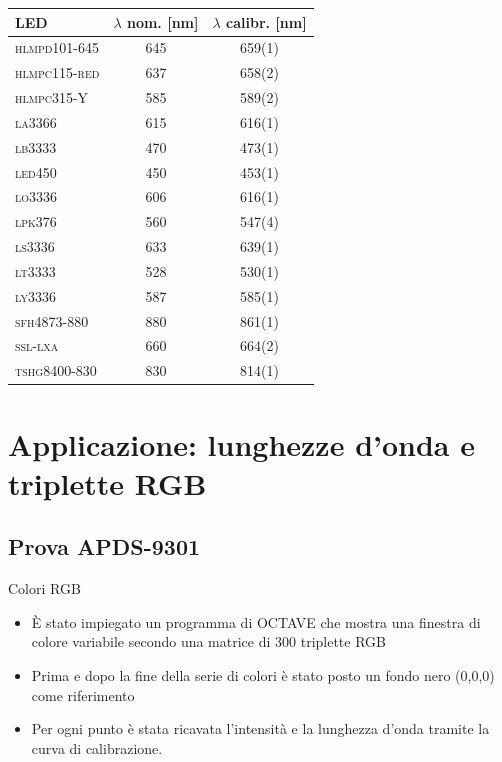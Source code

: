 \documentclass{beamer}
\begin{document}
\begin{frame}
\begin{table}[h]
\centering
\begin{tabular}{l|c|c}
\hline
\textbf{LED} & $\lambda$ nom. [nm] & $\lambda$ calibr. [nm] \\
\hline
\textsc{hlmpd101-645} & 645 & 659(1) \\
\textsc{hlmpc115-red} & 637 & 658(2)  \\
\textsc{hlmpc315-Y} & 585 & 589(2)  \\
\textsc{la3366} & 615 & 616(1) \\
\textsc{lb3333} & 470 & 473(1) \\
\textsc{led450} & 450 & 453(1) \\
\textsc{lo3336} & 606 & 616(1) \\
\textsc{lpk376} & 560 & 547(4) \\
\textsc{ls3336} & 633 & 639(1) \\
\textsc{lt3333} & 528 & 530(1) \\
\textsc{ly3336} & 587 & 585(1) \\
\textsc{sfh4873-880} & 880 & 861(1) \\
\textsc{ssl-lxa} & 660 & 664(2) \\
\textsc{tshg8400-830} & 830 & 814(1) \\
\hline
\end{tabular}
\end{table}
\end{frame}

\section{Applicazione: lunghezze d'onda e triplette RGB}
\subsection{Prova APDS-9301}

\begin{frame}{Colori RGB}
\begin{itemize}
\item È stato impiegato un programma di OCTAVE che mostra una finestra di colore variabile secondo una matrice di 300 triplette RGB\\
\item Prima e dopo la fine della serie di colori è stato posto un fondo nero (0,0,0) come riferimento\\
\item Per ogni punto è stata ricavata l'intensità e la lunghezza d'onda tramite la curva di calibrazione.
\end{itemize}
\end{frame}
\end{document}
